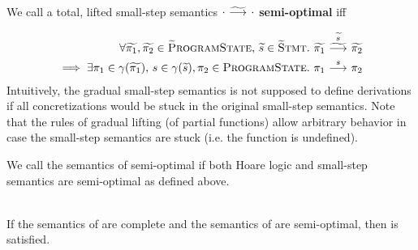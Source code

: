 \begin{definition}
    \label{def:perf-dyn}~\\
    We call a total, lifted small-step semantics $\gsstep{\cdot}{\cdot}$ \textbf{semi-optimal} iff
    \begin{comment}
    \forall \grad{\pi} \in \setGProgramState.~ (\forall \pi \in \gamma(\grad{\pi}).~ \sstepStuck{\pi}) \implies \gsstep{\grad{\pi}}{\pi_{EX}}
    \end{comment}
    \begin{align*}
    \forall \grad{\pi_1}, \grad{\pi_2} \in \setGProgramState,\, \grad{s} \in \setGStmt.&~ \gsstepConsume{\grad{s}}{\grad{\pi_1}}{\grad{\pi_2}}\\ \implies \exists \pi_1 \in \gamma(\grad{\pi_1}),\, s \in \gamma(\grad{s}), \pi_2 \in \setProgramState.&~ \sstepConsume{s}{\pi_1}{\pi_2}
    \end{align*}
    Intuitively, the gradual small-step semantics is not supposed to define derivations if all concretizations would be stuck in the original small-step semantics.
    Note that the rules of gradual lifting (of partial functions) allow arbitrary behavior in case the small-step semantics are stuck (i.e. the function is undefined).
\end{definition}

We call the semantics of \gvl semi-optimal if both Hoare logic and small-step semantics are semi-optimal as defined above.

\begin{theorem}
    \label{thm:compl-and-so-to-gdpres}~\\
    If the semantics of \svl are complete and the semantics of \gvl are semi-optimal, then  is satisfied.
\end{theorem}
